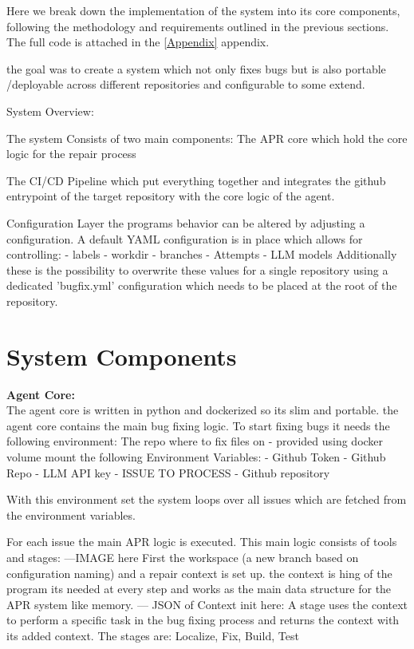Here we break down the implementation of the system into its core components, following the methodology and requirements outlined in the previous sections. The full code is attached in the \ref{Appendix} appendix.

the goal was to create a system which not only fixes bugs but is also portable /deployable across different repositories and configurable to some extend.


System Overview:

The system Consists of two main components:
The APR core which hold the core logic for the repair process

The CI/CD Pipeline which put everything together and integrates the github entrypoint of the target repository with the core logic of the agent.

Configuration Layer
the programs behavior can be altered by adjusting a configuration.
A default YAML configuration is in place which allows for controlling:
- labels
- workdir
- branches
- Attempts
- LLM models
Additionally these is the possibility to overwrite these values for a single repository using a dedicated 'bugfix.yml' configuration which needs to be placed at the root of the repository.

\section{System Components}
\textbf{Agent Core:}\\
The agent core is written in python and dockerized so its slim and portable.
the agent core contains the main bug fixing logic.
To start fixing bugs it needs the following environment:
The repo where to fix files on - provided using docker volume mount
the following Environment Variables:
- Github Token
- Github Repo
- LLM API key
- ISSUE TO PROCESS
- Github repository

With this environment set the system loops over all issues which are fetched from the environment variables.

For each issue the main APR logic is executed. This main logic consists of tools and stages:
---IMAGE here
First the workspace (a new branch based on configuration naming) and a repair context is set up. the context is hing of the program its needed at every step and works as the main data structure for the APR system like memory.
--- JSON of Context init here:
A stage uses the context to perform a specific task in the bug fixing process and returns the context with its added context. The stages are: Localize, Fix, Build, Test


